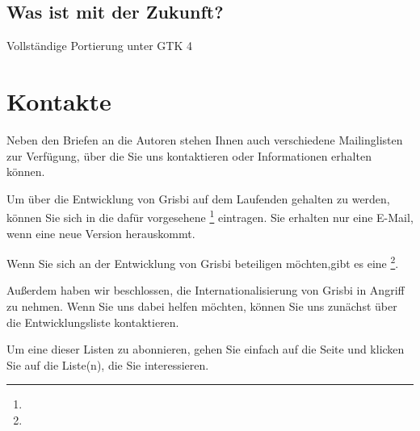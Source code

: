 \subsection{Was ist mit der Zukunft?}%

Vollständige Portierung unter \gls{GTK} 4%


\section{Kontakte\label{introduction-contacts}} 	%


Neben den Briefen an die Autoren stehen Ihnen auch verschiedene Mailinglisten zur Verfügung, über die Sie uns kontaktieren oder Informationen erhalten können.

Um über die Entwicklung von Grisbi auf dem Laufenden gehalten zu werden, können Sie sich in die dafür vorgesehene \footnote{\urlListInfoEmail{}} eintragen. Sie erhalten nur eine E-Mail, wenn eine neue Version herauskommt.

Wenn Sie sich an der Entwicklung von Grisbi beteiligen möchten,gibt es eine \footnote{\urlListDevelEmail{}}.

Außerdem haben wir beschlossen, die Internationalisierung von Grisbi in Angriff zu nehmen. Wenn Sie uns dabei helfen möchten, können Sie uns zunächst über die Entwicklungsliste kontaktieren.

Um eine dieser Listen zu abonnieren, gehen Sie einfach auf die Seite \urlListDiffGrisbi{} und klicken Sie auf die Liste(n), die Sie interessieren.

